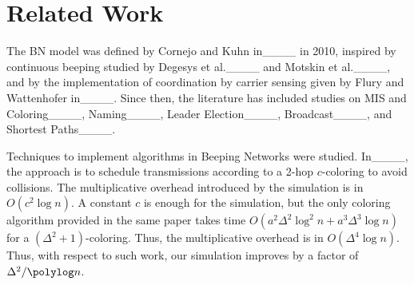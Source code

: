 \section{Related Work}
\label{sec:relwork}



The BN model was defined by Cornejo and Kuhn in____ in 2010, inspired by 
continuous beeping studied by Degesys et al.____ and Motskin et al.____, and by the implementation of coordination by carrier sensing given by Flury and Wattenhofer in____.
%
Since then, the literature has included studies on 
MIS and Coloring____, 
Naming____, 
Leader Election____, 
Broadcast____,
and Shortest Paths____.

Techniques to implement \congest algorithms in Beeping Networks were studied. In____,
the approach is to schedule transmissions according to a 2-hop $c$-coloring to avoid collisions. The multiplicative overhead introduced by the simulation is in $O(c^2 \log n)$. A constant $c$ is enough for the simulation, but the only coloring algorithm provided in the same paper takes time $O(a^2\Delta^2\log^2 n +a^3 \Delta^3 \log n)$ for a $(\Delta^2+1)$-coloring. Thus, the multiplicative overhead is in $O(\Delta^4 \log n)$. 
Thus, with respect to such work, our simulation improves by a factor of $\Delta^2/\polylog n$.

